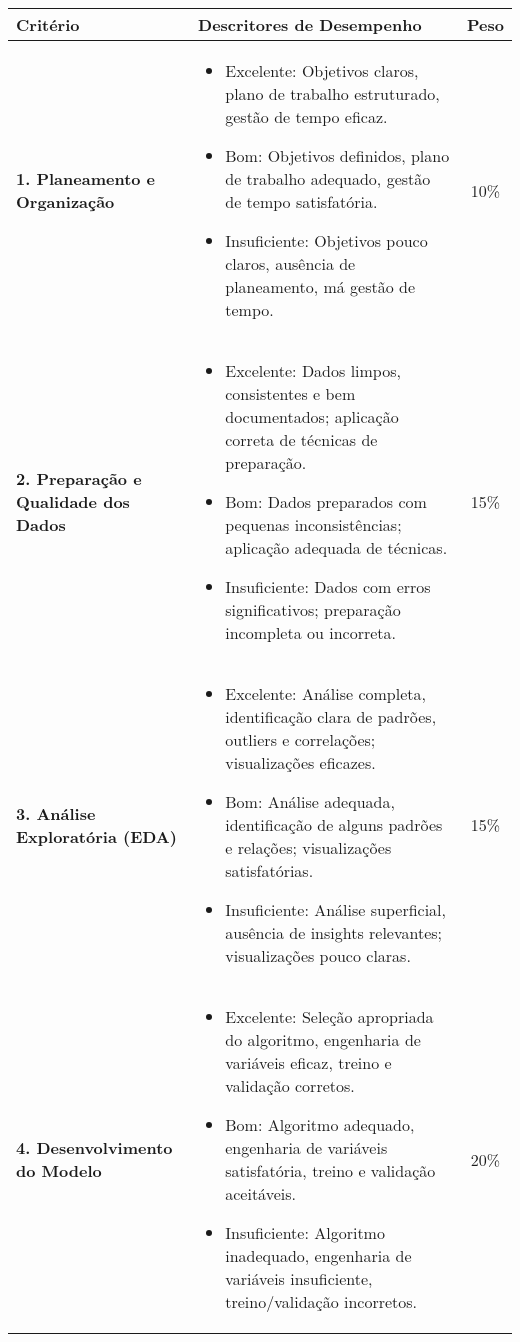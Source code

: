 \documentclass[12pt]{article}
\begin{document}
\begin{center}
\renewcommand{\arraystretch}{1.5}
\begin{tabular}{p{4cm} p{7cm} c}
\toprule
\textbf{Critério} & \textbf{Descritores de Desempenho} & \textbf{Peso} \\
\midrule

\textbf{1. Planeamento e Organização} &
\begin{itemize}[leftmargin=*]
  \item Excelente: Objetivos claros, plano de trabalho estruturado, gestão de tempo eficaz.
  \item Bom: Objetivos definidos, plano de trabalho adequado, gestão de tempo satisfatória.
  \item Insuficiente: Objetivos pouco claros, ausência de planeamento, má gestão de tempo.
\end{itemize}
& 10\% \\

\textbf{2. Preparação e Qualidade dos Dados} &
\begin{itemize}[leftmargin=*]
  \item Excelente: Dados limpos, consistentes e bem documentados; aplicação correta de técnicas de preparação.
  \item Bom: Dados preparados com pequenas inconsistências; aplicação adequada de técnicas.
  \item Insuficiente: Dados com erros significativos; preparação incompleta ou incorreta.
\end{itemize}
& 15\% \\

\textbf{3. Análise Exploratória (EDA)} &
\begin{itemize}[leftmargin=*]
  \item Excelente: Análise completa, identificação clara de padrões, outliers e correlações; visualizações eficazes.
  \item Bom: Análise adequada, identificação de alguns padrões e relações; visualizações satisfatórias.
  \item Insuficiente: Análise superficial, ausência de insights relevantes; visualizações pouco claras.
\end{itemize}
& 15\% \\

\textbf{4. Desenvolvimento do Modelo} &
\begin{itemize}[leftmargin=*]
  \item Excelente: Seleção apropriada do algoritmo, engenharia de variáveis eficaz, treino e validação corretos.
  \item Bom: Algoritmo adequado, engenharia de variáveis satisfatória, treino e validação aceitáveis.
  \item Insuficiente: Algoritmo inadequado, engenharia de variáveis insuficiente, treino/validação incorretos.
\end{itemize}
& 20\% \\



\end{tabular}
\end{center}
\end{document}
